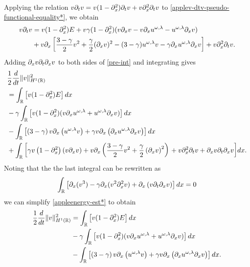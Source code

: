 	Applying the relation $v\partial_t v = v(1-\partial_x^2) \partial_t v + v\partial_x^2 \partial_t v$ to
	\eqref{applev-dtv-pseudo-functional-equality*}, we obtain
	\begin{equation}
		\label{pre-int}
		\begin{split}
		v \partial_t v &= v(1- \partial_x^2)E + v\gamma(1- \partial_x^2)(v\partial_x v - v\partial_x u^{\omega,\lambda} -
			u^{\omega,\lambda} \partial_x v)
			\\
			&+ v\partial_x \left[ \frac{3-\gamma}{2}v^2 + \frac{\gamma}{2}(\partial_x v)^2 -
			(3-\gamma)u^{\omega,\lambda} v - \gamma \partial_x u^{\omega,\lambda} \partial_x v
			\right] + v\partial_x^2 \partial_t v.
		\end{split}
	\end{equation}
	Adding $\partial_x v \partial_t \partial_x v$ to both sides of \eqref{pre-int} and 
	integrating gives
	\begin{equation}
		\label{appleenergy-est*}
		\begin{split}
			&\frac{1}{2} \frac{d}{dt} \|v\|_{H^1(\mathbb{R})}^2  
			\\
		& =  \int_{\mathbb{R}} \left[ v(1-\partial_x^2)E \right]dx
		\\
		& - \gamma \int_{\mathbb{R}} \left[ v(1-\partial_x^2)(v\partial_x u^{\omega,\lambda} + u^{\omega,\lambda} \partial_x v) \right]dx
		\\
		&- \int_{\mathbb{R}}\left[ \left( 3-\gamma \right)v \partial_x\left( u^{\omega,\lambda}v \right) + \gamma v
		\partial_x \left( \partial_x u^{\omega,\lambda} \partial_x v \right)\right]dx
		\\
		&+  \int_{\mathbb{R}}
		\left[ \gamma v \left( 1-\partial_x^2 \right)\left( v \partial_x v \right) + v
		\partial_x \left( \frac{3-\gamma}{2} v^2 + \frac{\gamma}{2}\left( \partial_x v \right)^2
		\right) \right . +  v \partial_x^2 \partial_t v + \partial_x v \partial_t \partial_x v\bigg]dx.
	\end{split}
\end{equation}
Noting that the the last integral can be rewritten as 
\begin{equation*}
	\begin{split}
	\int_{\mathbb{R}} \left[ \partial_x (v^3) - \gamma \partial_x (v^2 \partial_x^2 v) + \partial_x\left( v \partial_t
	\partial_x v
	\right) \right]dx  = 0
\end{split}
\end{equation*}
%
we can simplify \eqref{appleenergy-est*} to obtain
%
%
\begin{equation}
\label{appleenergy-est}
\begin{split}
\frac{1}{2} \frac{d}{dt} \|v\|_{H^1(\mathbb{R})}^2  
& = 
 \int_{\mathbb{R}} \left[ v(1-\partial_x^2)E \right]dx\\
 &-
 \gamma \int_{\mathbb{R}} \left[ v(1-\partial_x^2)(v\partial_x u^{\omega,\lambda} + 
u^{\omega,\lambda} \partial_x v) \right]dx
\\
&- \int_{\mathbb{R}}\left[ \left( 3-\gamma \right)v \partial_x\left( u^{\omega,\lambda}v 
\right) + \gamma v
\partial_x \left( \partial_x u^{\omega,\lambda} \partial_x v \right)\right]dx.
\end{split}
\end{equation}
